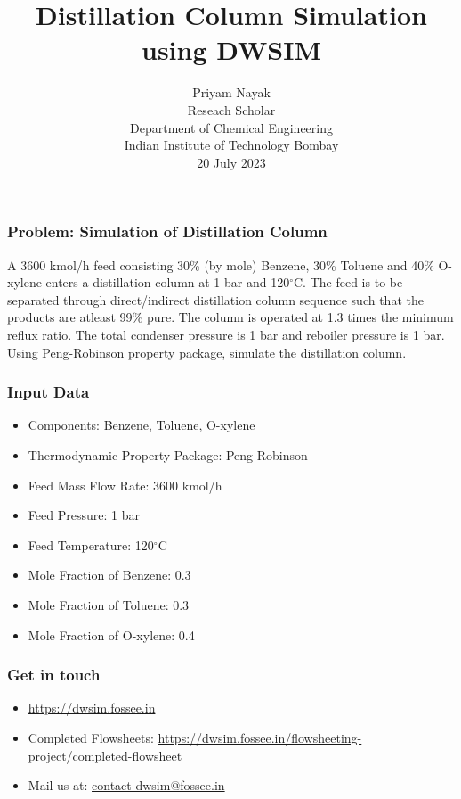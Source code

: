 \documentclass[12pt,xcolor=table]{beamer}
\begin{document}
\sffamily \bfseries
\title
[Distillation Column Simulation using DWSIM]
{Distillation Column Simulation using DWSIM}

\author [Priyam Nayak]
{\small
  Priyam Nayak \\ Reseach Scholar \\Department of Chemical Engineering\\ Indian Institute of Technology Bombay\\ [0.1cm]
\small 20 July 2023}
\date{}
\begin{frame}
   \titlepage
\end{frame}



\begin{frame}
\frametitle{Problem: Simulation of Distillation Column}
A 3600 kmol/h feed consisting 30\% (by mole) Benzene, 30\% Toluene and 40\% O-xylene enters a distillation column at 1 bar and 120$^\circ$C. The feed is to be separated through direct/indirect distillation column sequence such that the products are atleast 99\% pure. The column is operated at 1.3 times the minimum reflux ratio. The total condenser pressure is 1 bar and reboiler pressure is 1 bar. Using Peng-Robinson property package, simulate the distillation column.
\end{frame}

\begin{frame}
	\frametitle{Input Data}
	\begin{itemize}
		\item Components: Benzene, Toluene, O-xylene
		\item Thermodynamic Property Package: Peng-Robinson
		\item Feed Mass Flow Rate: 3600 kmol/h
		\item Feed Pressure: 1 bar
		\item Feed Temperature: 120$^\circ$C
		\item Mole Fraction of Benzene: 0.3
		\item Mole Fraction of Toluene: 0.3
		\item Mole Fraction of O-xylene: 0.4
	\end{itemize}
\end{frame}


\begin{frame}
	\frametitle{Get in touch}
	\begin{itemize}
	\item \url{https://dwsim.fossee.in}
	\item Completed Flowsheets: \url{https://dwsim.fossee.in/flowsheeting-project/completed-flowsheet}
	\item Mail us at: \url{contact-dwsim@fossee.in}
\end{itemize}

\end{frame}
\end{document}
